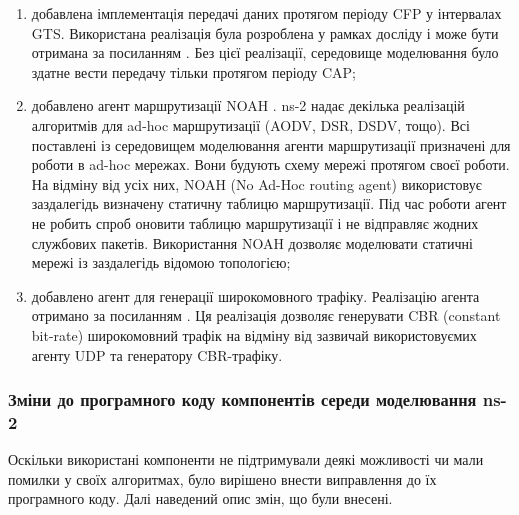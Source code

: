 \documentclass[a4paper,ukrainian,utf8,nocolumnsxix,nocolumnxxxii,nocolumnxxxi,floatsection,equationsection]{eskdtext}
\renewcommand\paragraph{\subsubsection}
\begin{document}
\begin{enumerate}
	\item добавлена імплементація передачі даних протягом періоду CFP у інтервалах GTS. Використана реалізація була розроблена у рамках досліду \cite{ns2:with:cfp} і може бути отримана за посиланням \cite{ns2:with:cfp:sources}. Без цієї реалізації, середовище моделювання було здатне вести передачу тільки протягом періоду CAP;

	\item добавлено агент маршрутизації NOAH \cite{ns2:noah}. ns-2 надає декілька реалізацій алгоритмів для ad-hoc маршрутизації (AODV, DSR, DSDV, тощо). Всі поставлені із середовищем моделювання агенти маршрутизації призначені для роботи в ad-hoc мережах. Вони будують схему мережі протягом своєї роботи. На відміну від усіх них, NOAH (No Ad-Hoc routing agent) використовує заздалегідь визначену статичну таблицю маршрутизації. Під час роботи агент не робить спроб оновити таблицю маршрутизації і не відправляє жодних службових пакетів. Використання NOAH дозволяє моделювати статичні мережі із заздалегідь відомою топологією;

	\item добавлено агент для генерації широкомовного трафіку. Реалізацію агента отримано за посиланням \cite{ns2:broadcastapp}. Ця реалізація дозволяє генерувати CBR (constant bit-rate) широкомовний трафік на відміну від зазвичай використовуємих агенту UDP та генератору CBR-трафіку.

\end{enumerate}

\paragraph{Зміни до програмного коду компонентів середи моделювання ns-2}

Оскільки використані компоненти не підтримували деякі можливості чи мали помилки у своїх алгоритмах, було вирішено внести виправлення до їх програмного коду. Далі наведений опис змін, що були внесені. 
\end{document}
